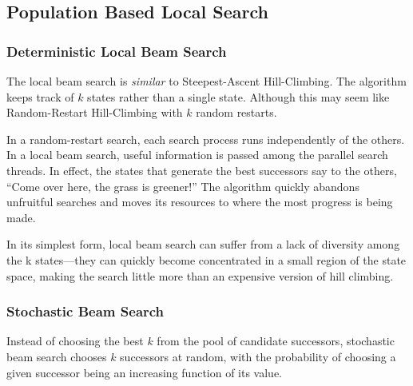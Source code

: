 \begin{algorithmic}[1]

        \State{}

            \EndIf{}

            \State{}

            \Else{}
            \EndIf{}

        \EndFor{}

    \EndFunction{}
\end{algorithmic}

\subsection{Population Based Local Search}
\subsubsection{Deterministic Local Beam Search}
The local beam search is \textit{similar} to Steepest-Ascent Hill-Climbing. The algorithm keeps track of $k$ states rather than a single state. Although this may seem like Random-Restart Hill-Climbing with $k$ random restarts.

In a random-restart search, each search process runs independently of the others. In a local beam search, useful information is passed among the parallel search threads. In effect, the states that generate the best successors say to the others, ``Come over here, the grass is greener!'' The algorithm quickly abandons unfruitful searches and moves its resources to where the most progress is being made.

In its simplest form, local beam search can suffer from a lack of diversity among the k states—they can quickly become concentrated in a small region of the state space, making the search little more than an expensive version of hill climbing.

\subsubsection{Stochastic Beam Search}
Instead of choosing the best $k$ from the pool of candidate successors, stochastic beam search chooses $k$ successors at random, with the probability of choosing a given successor being an increasing function of its value.

